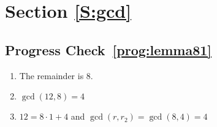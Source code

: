\section*{Section \ref{S:gcd}}
\subsection*{Progress Check~\ref{prog:lemma81}}
\begin{multicols}{2}
\begin{enumerate}
\item The remainder is 8.
\item $\gcd(12, 8) = 4$
\item $12 = 8 \cdot 1 + 4$ and $\gcd(r, r_2) = \gcd(8, 4) = 4$
\end{enumerate}
\end{multicols}


